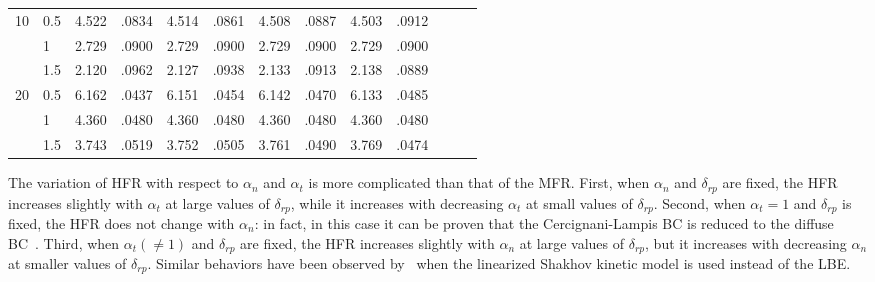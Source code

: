\begin{table}[t]
\begin{tabular}{clccclccccccc}
		10 & 0.5 & 4.522 & .0834 & 4.514 & .0861 & 4.508 & .0887 & 4.503 & .0912 &   \\ 
		& 1 & 2.729 & .0900 & 2.729 & .0900 & 2.729 & .0900 & 2.729 & .0900 & \\ 
		& 1.5 & 2.120 & .0962 & 2.127 & .0938 & 2.133 & .0913 & 2.138 & .0889 &  \\ 
		20 & 0.5 & 6.162 & .0437 & 6.151 & .0454 & 6.142 & .0470 & 6.133 & .0485 &  \\ 
		& 1 & 4.360 & .0480 & 4.360 & .0480 & 4.360 & .0480 & 4.360 & .0480 &  \\ 
		& 1.5 & 3.743 & .0519 & 3.752 & .0505 & 3.761 & .0490 & 3.769 & .0474&  \\ 
		\hline
	\end{tabular}%
	\label{table_poiseuille_1d_BC}
\end{table}




The variation of HFR with respect to $\alpha _{n}$ and $\alpha _{t}$ is more complicated than that of the MFR. First, when $\alpha _{n}$ and $\delta_{rp}$ are fixed, the HFR increases slightly with $\alpha _{t}$ at large values of $\delta_{rp} $, while it increases with decreasing $\alpha _{t}$ at small values of $\delta_{rp} $. Second, when $\alpha _{t}=1$ and $\delta_{rp} $ is fixed, the HFR does not change with $\alpha _{n}$: in fact, in this case it can be proven that the Cercignani-Lampis  BC is reduced to the diffuse  BC~\citep{Sharipov2002CL}. Third, when $\alpha_{t}(\neq1)$ and $\delta_{rp} $ are fixed, the HFR increases slightly with $\alpha _{n}$ at large values of $\delta_{rp}$, but it increases with decreasing $\alpha _{n}$ at smaller values of $\delta_{rp} $. Similar behaviors have been observed by~\cite{Sharipov2002CL} when the linearized Shakhov kinetic model is used instead of the LBE.

